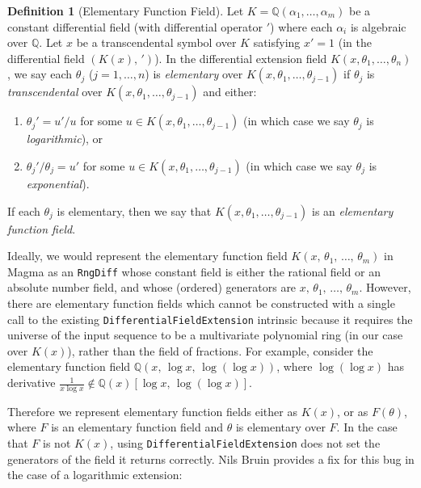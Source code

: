 \documentclass{article}
\theoremstyle{plain}
\theoremstyle{definition}
\newtheorem{definition}{Definition}
\newcommand{\Q}{\mathbb{Q}}
\begin{document}
\begin{definition}[Elementary Function Field] \label{elementary_field}
    Let $K = \mathbb{Q}(\alpha_1, \dots, \alpha_m)$ be a constant differential
    field (with differential operator $'$) where each $\alpha_i$ is algebraic
    over $\mathbb{Q}$. Let $x$ be a transcendental symbol over $K$ satisfying
    $x' = 1$ (in the differential field $(K(x),\, ')$). In the differential
    extension field $K(x, \theta_1, \dots, \theta_n)$, we say each $\theta_j$
    ($j = 1, \dots, n$) is \emph{elementary} over $K(x, \theta_1, \dots,
    \theta_{j - 1})$ if $\theta_j$ is \emph{transcendental} over $K(x, \theta_1,
    \dots, \theta_{j - 1})$ and either:
    \begin{enumerate}[label=(\roman*)]
        \item $\theta_j' = u'/u$ for some $u \in K(x, \theta_1, \dots,
            \theta_{j - 1})$ (in which case we say $\theta_j$ is
            \emph{logarithmic}), or
        \item $\theta_j'/\theta_j = u'$ for some $u \in K(x, \theta_1, \dots,
            \theta_{j - 1})$ (in which case we say $\theta_j$ is
            \emph{exponential}).
    \end{enumerate}
    If each $\theta_j$ is elementary, then we say that $K(x, \theta_1, \dots,
    \theta_{j - 1})$ is an \emph{elementary function field}.
\end{definition}

Ideally, we would represent the elementary function field $K(x,\, \theta_1,\,
\dots,\, \theta_m)$ in Magma as an \lstinline{RngDiff} whose constant field is
either the rational field or an absolute number field, and whose (ordered)
generators are $x,\, \theta_1,\, \dots,\, \theta_m$. However, there are
elementary function fields which cannot be constructed with a single call to the
existing \lstinline{DifferentialFieldExtension} intrinsic because it requires
the universe of the input sequence to be a multivariate polynomial ring (in our
case over $K(x)$), rather than the field of fractions. For example, consider the
elementary function field $\Q(x,\, \log x,\, \log(\log x))$, where
$\log(\log x)$ has derivative $\frac 1 {x \log x} \not \in \Q(x)[\log x,\,
\log(\log x)]$. \medbreak

Therefore we represent elementary function fields either as $K(x)$, or as
$F(\theta)$, where $F$ is an elementary function field and $\theta$ is
elementary over $F$. In the case that $F$ is not $K(x)$, using
\lstinline{DifferentialFieldExtension} does not set the generators of the field
it returns correctly. Nils Bruin provides a fix for this bug in the case of a
logarithmic extension:
\end{document}
